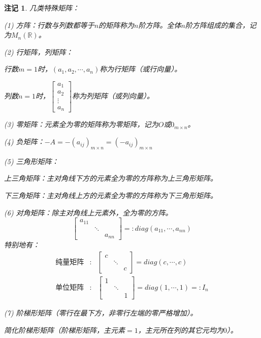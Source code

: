 \documentclass[a4paper]{book}
\newtheorem{rmk}{注记}[chapter]
\newcommand{\enum}{\begin{list}{}{\setlength{\leftmargin}{0pt} \setlength{\itemindent}{2.5em} \setlength{\listparindent}{2em}}}
\begin{document}
\begin{rmk}
几类特殊矩阵：
\enum
\item[(1)] 方阵：行数与列数都等于$n$的矩阵称为$n$阶方阵。全体$n$阶方阵组成的集合，记为$M_n(\mathbb{R})$。
\item[(2)] 行矩阵，列矩阵：

行数$m=1$时，$(a_1,a_2,\cdots,a_n)$称为行矩阵（或行向量）。

列数$n=1$时，$\begin{bmatrix} a_1 \\ a_2 \\ \vdots \\ a_n \end{bmatrix}$称为列矩阵（或列向量）。
\item[(3)] 零矩阵：元素全为零的矩阵称为零矩阵，记为$O$或$0_{m\times n}$。
\item[(4)] 负矩阵：$-A = -(a_{ij})_{m\times n} = (-a_{ij})_{m\times n}$
\item[(5)] 三角形矩阵：

上三角矩阵：主对角线下方的元素全为零的方阵称为上三角形矩阵。

下三角矩阵：主对角线上方的元素全为零的方阵称为下三角形矩阵。
\item[(6)] 对角矩阵：除主对角线上元素外，全为零的方阵。
$$\begin{bmatrix} a_{11} & & \\ & \ddots & \\ & & a_{nn} \end{bmatrix} =: diag(a_{11},\cdots,a_{nn})$$
特别地有：
\begin{eqnarray*}
\text{纯量矩阵} & : & \begin{bmatrix} c & & \\ & \ddots & \\ & & c \end{bmatrix} = diag(c,\cdots,c) \\
\text{单位矩阵} & : & \begin{bmatrix} 1 & & \\ & \ddots & \\ & & 1 \end{bmatrix} = diag(1,\cdots,1) =: I_n
\end{eqnarray*}
\item[(7)] 阶梯形矩阵（零行在最下方，非零行左端的零严格增加）。

简化阶梯形矩阵（阶梯形矩阵，主元素$=1$，主元所在列的其它元均为$0$）。
\end{list}
\end{rmk}
\end{document}
